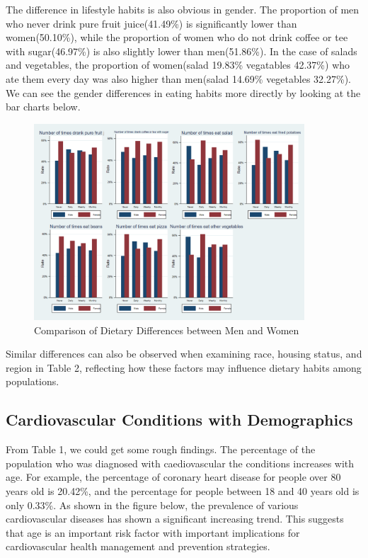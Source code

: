 \documentclass{article}
\begin{document}
The difference in lifestyle habits is also obvious in gender. The proportion of men who never drink pure fruit juice(41.49\%) is significantly lower than women(50.10\%), while the proportion of women who do not drink coffee or tee with sugar(46.97\%) is also slightly lower than men(51.86\%). In the case of salads and vegetables, the proportion of women(salad 19.83\% vegatables 42.37\%) who ate them every day was also higher than men(salad 14.69\% vegetables 32.27\%). We can see the gender differences in eating habits more directly by looking at the bar charts below.


\begin{figure}[!h]
	\centering
	\includegraphics[width=0.9\textwidth]{../Image/Graph03.png}
	\caption{Comparison of Dietary Differences between Men and Women}
	\label{fig:G3}
\end{figure}


Similar differences can also be observed when examining race, housing status, and region in Table 2, reflecting how these factors may influence dietary habits among populations.



\subsection{Cardiovascular Conditions with Demographics}

From Table 1, we could get some rough findings. The percentage of the population who was diagnosed with caediovascular the conditions increases with age. For example, the percentage of coronary heart disease for people over 80 years old is 20.42\%, and the percentage for people between 18 and 40 years old is only 0.33\%. As shown in the figure below, the prevalence of various cardiovascular diseases has shown a significant increasing trend. This suggests that age is an important risk factor with important implications for cardiovascular health management and prevention strategies.
\end{document}
